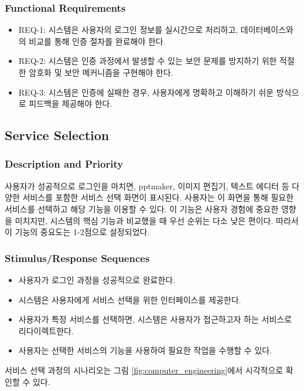 \documentclass[a4paper, 12pt]{article}
\begin{document}
\subsubsection{Functional Requirements}
\begin{itemize}
  \item REQ-1: 시스템은 사용자의 로그인 정보를 실시간으로 처리하고, 데이터베이스와의 비교를 통해 인증 절차를 완료해야 한다.
  \item REQ-2: 시스템은 인증 과정에서 발생할 수 있는 보안 문제를 방지하기 위한 적절한 암호화 및 보안 메커니즘을 구현해야 한다.
  \item REQ-3: 시스템은 인증에 실패한 경우, 사용자에게 명확하고 이해하기 쉬운 방식으로 피드백을 제공해야 한다.
\end{itemize}

\subsection{Service Selection}

\subsubsection{Description and Priority}
사용자가 성공적으로 로그인을 마치면, pptmaker, 이미지 편집기, 텍스트 에디터 등 다양한 서비스를 포함한 서비스 선택 화면이 표시된다. 사용자는 이 화면을 통해 필요한 서비스를 선택하고 해당 기능을 이용할 수 있다. 이 기능은 사용자 경험에 중요한 영향을 미치지만, 시스템의 핵심 기능과 비교했을 때 우선 순위는 다소 낮은 편이다. 따라서 이 기능의 중요도는 1-2점으로 설정되었다.

\subsubsection{Stimulus/Response Sequences}
\begin{itemize}
  \item 사용자가 로그인 과정을 성공적으로 완료한다.
  \item 시스템은 사용자에게 서비스 선택을 위한 인터페이스를 제공한다.
  \item 사용자가 특정 서비스를 선택하면, 시스템은 사용자가 접근하고자 하는 서비스로 리다이렉트한다.
  \item 사용자는 선택한 서비스의 기능을 사용하여 필요한 작업을 수행할 수 있다.
\end{itemize}

서비스 선택 과정의 시나리오는 그림 \ref{fig:computer_engineering}에서 시각적으로 확인할 수 있다.
\end{document}

